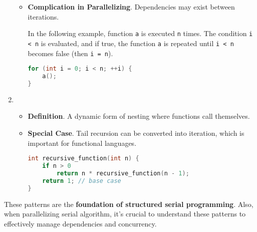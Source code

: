 \begin{enumerate}
\begin{itemize}
        \item[\textcolor{Red2}{\faIcon{exclamation-triangle}}] \textcolor{Red2}{\textbf{Complication in Parallelizing}}. Dependencies may exist between iterations.
        \begin{examplebox}
            In the following example, function \texttt{a} is executed \texttt{n} times. The condition \texttt{i < n} is evaluated, and if true, the function \texttt{a} is repeated until \texttt{i < n} becomes false (then \texttt{i = n}).
            \begin{lstlisting}[language=c]
for (int i = 0; i < n; ++i) {
    a();
}\end{lstlisting}
        \end{examplebox}
    \end{itemize}
  
    \item {}
    \begin{itemize}
        \item[\textcolor{Red2}{\faIcon{book}}] \textcolor{Red2}{\textbf{Definition}}. A dynamic form of nesting where functions call themselves.

        \item[\textcolor{Green3}{\faIcon{star}}] \textcolor{Green3}{\textbf{Special Case}}. Tail recursion can be converted into iteration, which is important for functional languages.
        \begin{examplebox}
            \begin{lstlisting}[language=c]
int recursive_function(int n) {
    if n > 0
        return n * recursive_function(n - 1);
    return 1; // base case
}\end{lstlisting}
        \end{examplebox}
    \end{itemize}
\end{enumerate}
These patterns are the \textbf{foundation of structured serial programming}. Also, when parallelizing serial algorithm, it's crucial to understand these patterns to effectively manage dependencies and concurrency.